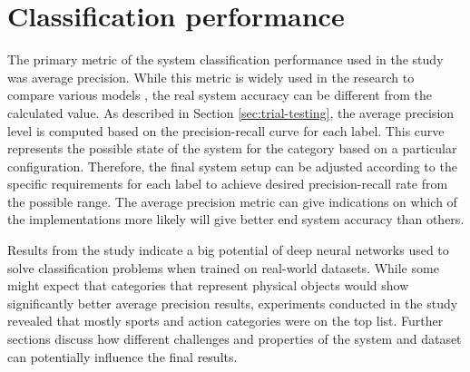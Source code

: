 
\section{Classification performance}
The primary metric of the system classification performance used in the study was average precision. While this metric is widely used in the research to compare various models \cite{Everingham2010PASCAL-VOC}, the real system accuracy can be different from the calculated value. As described in Section \ref{sec:trial-testing}, the average precision level is computed based on the precision-recall curve for each label. This curve represents the possible state of the system for the category based on a particular configuration. Therefore, the final system setup can be adjusted according to the specific requirements for each label to achieve desired precision-recall rate from the possible range. The average precision metric can give indications on which of the implementations more likely will give better end system accuracy than others.

Results from the study indicate a big potential of deep neural networks used to solve classification problems when trained on real-world datasets. While some might expect that categories that represent physical objects would show significantly better average precision results, experiments conducted in the study revealed that mostly sports and action categories were on the top list. Further sections discuss how different challenges and properties of the system and dataset can potentially influence the final results.






